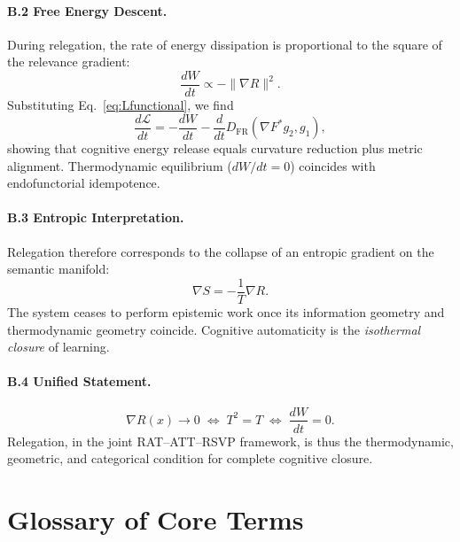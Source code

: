 \documentclass[12pt,a4paper,twoside,openright]{book}
\begin{document}
\paragraph{B.2 Free Energy Descent.}
During relegation, the rate of energy dissipation is proportional
to the square of the relevance gradient:
\[
\frac{dW}{dt} \propto -\|\nabla R\|^2.
\]
Substituting Eq.~\eqref{eq:Lfunctional}, we find
\[
\frac{d\mathcal{L}}{dt}
= -\frac{dW}{dt} - \frac{d}{dt}D_{\mathrm{FR}}(\nabla F^* g_2,g_1),
\]
showing that cognitive energy release equals curvature reduction
plus metric alignment. Thermodynamic equilibrium
($dW/dt=0$) coincides with endofunctorial idempotence.

\paragraph{B.3 Entropic Interpretation.}
Relegation therefore corresponds to the collapse of an
entropic gradient on the semantic manifold:
\[
\nabla S = -\frac{1}{T}\nabla R.
\]
The system ceases to perform epistemic work once
its information geometry and thermodynamic geometry coincide.
Cognitive automaticity is the \emph{isothermal closure} of learning.

\paragraph{B.4 Unified Statement.}
\[
\nabla R(x)\to 0
\;\Longleftrightarrow\;
T^2=T
\;\Longleftrightarrow\;
\frac{dW}{dt}=0.
\]
Relegation, in the joint RAT--ATT--RSVP framework,
is thus the thermodynamic, geometric, and categorical condition
for complete cognitive closure.

\section{Glossary of Core Terms}
\end{document}
